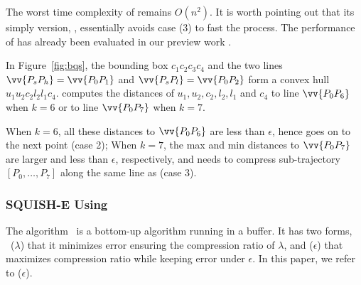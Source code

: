 The worst time complexity of \bqsa remains $O(n^2)$. 
It is worth pointing out that its simply version, \fbqsa, essentially avoids case (3) to fast the process. The performance of \fbqsa has already been evaluated in our preview work \cite{Lin:Operb}.

\begin{example}
\label{exm-alg-bqs}
In Figure~\ref{fig:bqs}, the bounding box $c_1c_2c_3c_4$ and the two lines $\vv{P_sP_{h}} = \vv{P_0P_1}$ and $\vv{P_sP_{l}} = \vv{P_0P_2}$ form a convex hull $u_1u_2c_2l_2l_1c_4$. \bqsa computes the distances of $u_1,u_2,c_2,l_2,l_1$ and $c_4$ to line $\vv{P_0P_6}$ when $k=6$ or to line $\vv{P_0P_7}$ when $k=7$.

When $k=6$, all these distances to $\vv{P_0P_6}$  are less than $\epsilon$, hence \bqsa goes on to the next point (case 2); When $k=7$,
the max and min distances to $\vv{P_0P_7}$ are larger and less than $\epsilon$, respectively, and \bqsa needs to compress sub-trajectory $[P_0, \ldots, P_7]$ along the same line as \dpa (case 3).
\end{example}


\vspace{-0.5ex}
\subsubsection{SQUISH-E Using \sed}

The \squishe algorithm~\cite{Muckell:Compression} is a bottom-up algorithm running in a buffer. It has two forms, \ie~\squishe($\lambda$) that it minimizes \sed error ensuring the compression ratio of $\lambda$, and \squishe($\epsilon$) that maximizes compression ratio while keeping \sed error under $\epsilon$. In this paper, we refer to \squishe($\epsilon$).


